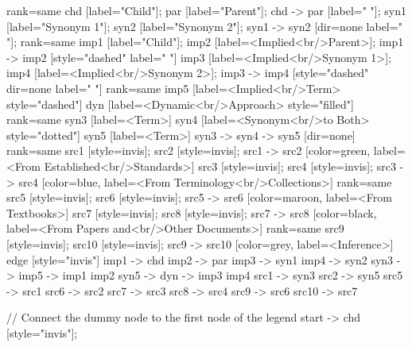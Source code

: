 \documentclass{article}
\begin{document}
{{    {
        rank=same
        chd [label="Child"];
        par [label="Parent"];
        chd -> par [label="                "];
        syn1 [label="Synonym 1"];
        syn2 [label="Synonym 2"];
        syn1 -> syn2 [dir=none label="                "];
    }
    {
        rank=same
        imp1 [label="Child"];
        imp2 [label=<Implied<br/>Parent>];
        imp1 -> imp2 [style="dashed" label="                "]
        imp3 [label=<Implied<br/>Synonym 1>];
        imp4 [label=<Implied<br/>Synonym 2>];
        imp3 -> imp4 [style="dashed" dir=none label="                "]
    }
    {
        rank=same
        imp5 [label=<Implied<br/>Term> style="dashed"]
        dyn [label=<Dynamic<br/>Approach> style="filled"]
    }
    {
        rank=same
        syn3 [label=<Term>]
        syn4 [label=<Synonym<br/>to Both> style="dotted"]
        syn5 [label=<Term>]
        syn3 -> syn4 -> syn5 [dir=none]
    }
{
rank=same
src1 [style=invis];
src2 [style=invis];
src1 -> src2 [color=green, label=<From Established<br/>Standards>]
src3 [style=invis];
src4 [style=invis];
src3 -> src4 [color=blue, label=<From Terminology<br/>Collections>]
}
{
rank=same
src5 [style=invis];
src6 [style=invis];
src5 -> src6 [color=maroon, label=<From Textbooks>]
src7 [style=invis];
src8 [style=invis];
src7 -> src8 [color=black, label=<From Papers and<br/>Other Documents>]
}
{
rank=same
src9 [style=invis];
src10 [style=invis];
src9 -> src10 [color=grey, label=<Inference>]
}
edge [style="invis"]
imp1 -> chd
imp2 -> par
imp3 -> syn1
imp4 -> syn2
syn3 -> imp5 -> { imp1 imp2 }
syn5 -> dyn -> { imp3 imp4 }
src1 -> syn3
src2 -> syn5
src5 -> src1
src6 -> src2
src7 -> src3
src8 -> src4
src9 -> src6
src10 -> src7
}

// Connect the dummy node to the first node of the legend
start -> chd [style="invis"];
}
\end{document}
